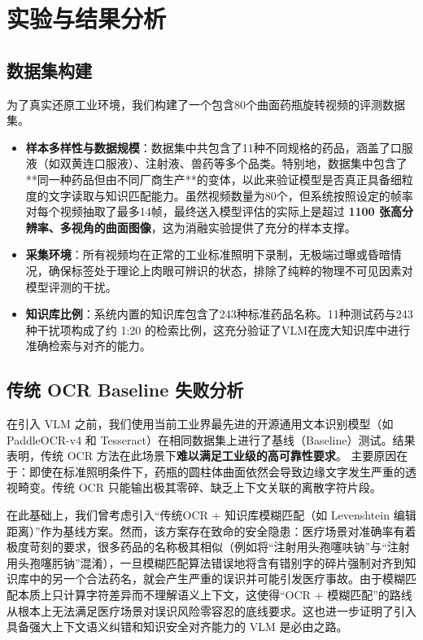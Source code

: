 \documentclass[11pt,a4paper]{ctexart}
\begin{document}
\section{实验与结果分析}
\subsection{数据集构建}
为了真实还原工业环境，我们构建了一个包含80个曲面药瓶旋转视频的评测数据集。
\begin{itemize}
    \item \textbf{样本多样性与数据规模}：数据集中共包含了11种不同规格的药品，涵盖了口服液（如双黄连口服液）、注射液、兽药等多个品类。特别地，数据集中包含了**同一种药品但由不同厂商生产**的变体，以此来验证模型是否真正具备细粒度的文字读取与知识匹配能力。虽然视频数量为80个，但系统按照设定的帧率对每个视频抽取了最多14帧，最终送入模型评估的实际上是超过 \textbf{1100 张高分辨率、多视角的曲面图像}，这为消融实验提供了充分的样本支撑。
    \item \textbf{采集环境}：所有视频均在正常的工业标准照明下录制，无极端过曝或昏暗情况，确保标签处于理论上肉眼可辨识的状态，排除了纯粹的物理不可见因素对模型评测的干扰。
    \item \textbf{知识库比例}：系统内置的知识库包含了243种标准药品名称。11种测试药与243种干扰项构成了约 1:20 的检索比例，这充分验证了VLM在庞大知识库中进行准确检索与对齐的能力。
\end{itemize}

\subsection{传统 OCR Baseline 失败分析}
在引入 VLM 之前，我们使用当前工业界最先进的开源通用文本识别模型（如 PaddleOCR-v4 和 Tesseract）在相同数据集上进行了基线（Baseline）测试。结果表明，传统 OCR 方法在此场景下\textbf{难以满足工业级的高可靠性要求}。
主要原因在于：即使在标准照明条件下，药瓶的圆柱体曲面依然会导致边缘文字发生严重的透视畸变。传统 OCR 只能输出极其零碎、缺乏上下文关联的离散字符片段。

在此基础上，我们曾考虑引入“传统OCR + 知识库模糊匹配（如 Levenshtein 编辑距离）”作为基线方案。然而，该方案存在致命的安全隐患：医疗场景对准确率有着极度苛刻的要求，很多药品的名称极其相似（例如将“注射用头孢噻呋钠”与“注射用头孢噻肟钠”混淆），一旦模糊匹配算法错误地将含有错别字的碎片强制对齐到知识库中的另一个合法药名，就会产生严重的误识并可能引发医疗事故。由于模糊匹配本质上只计算字符差异而不理解语义上下文，这使得“OCR + 模糊匹配”的路线从根本上无法满足医疗场景对误识风险零容忍的底线要求。这也进一步证明了引入具备强大上下文语义纠错和知识安全对齐能力的 VLM 是必由之路。
\end{document}
